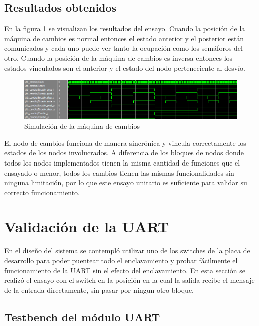 	\subsection{Resultados obtenidos}
			
		En la figura \ref{fig:Test_Cambios} se visualizan los resultados del ensayo. Cuando la posición de la máquina de cambios es normal entonces el estado anterior y el posterior están comunicados y cada uno puede ver tanto la ocupación como los semáforos del otro. Cuando la posición de la máquina de cambios es inversa entonces los estados vinculados son el anterior y el estado del nodo perteneciente al desvío.
		
		\begin{figure}[h]
		\centering
		\includegraphics[scale=0.55]{./Figures/Test/Cambio}
			\caption{Simulación de la máquina de cambios}
			\label{fig:Test_Cambios}
		\end{figure}
			
		El nodo de cambios funciona de manera sincrónica y vincula correctamente los estados de los nodos involucrados. A diferencia de los bloques de nodos donde todos los nodos implementados tienen la misma cantidad de funciones que el ensayado o menor, todos los cambios tienen las mismas funcionalidades sin ninguna limitación, por lo que este ensayo unitario es suficiente para validar su correcto funcionamiento.
				
\section{Validación de la UART}

	En el diseño del sistema se contempló utilizar uno de los switches de la placa de desarrollo para poder puentear todo el enclavamiento y probar fácilmente el funcionamiento de la UART sin el efecto del enclavamiento. En esta sección se realizó el ensayo con el switch en la posición en la cual la salida recibe el mensaje de la entrada directamente, sin pasar por ningun otro bloque.

	\subsection{Testbench del módulo UART}
			

